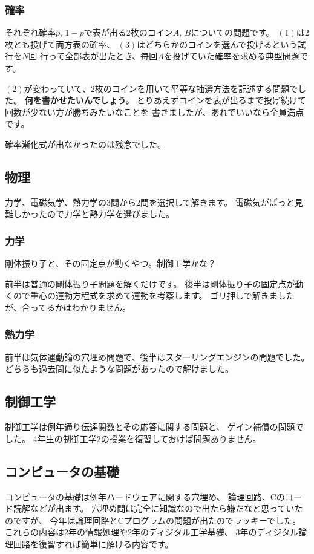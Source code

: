 \documentclass[]{jsarticle}
\begin{document}
        \subsubsection*{確率}
            それぞれ確率$p$, $1-p$で表が出る2枚のコイン$A$, $B$についての問題です。
            $(1)$は2枚とも投げて両方表の確率、
            $(3)$はどちらかのコインを選んで投げるという試行を$N$回
            行って全部表が出たとき、毎回$A$を投げていた確率を求める典型問題です。

            $(2)$が変わっていて、2枚のコインを用いて平等な抽選方法を記述する問題でした。
            \textbf{何を書かせたいんでしょう。}
            とりあえずコインを表が出るまで投げ続けて回数が少ない方が勝ちみたいなことを
            書きましたが、あれでいいなら全員満点です。

            確率漸化式が出なかったのは残念でした。
    \subsection*{物理}
        力学、電磁気学、熱力学の3問から2問を選択して解きます。
        電磁気がぱっと見難しかったので力学と熱力学を選びました。
        \subsubsection*{力学}
            剛体振り子と、その固定点が動くやつ。制御工学かな？

            前半は普通の剛体振り子問題を解くだけです。
            後半は剛体振り子の固定点が動くので重心の運動方程式を求めて運動を考察します。
            ゴリ押しで解きましたが、合ってるかはわかりません。
        \subsubsection*{熱力学}
            前半は気体運動論の穴埋め問題で、後半はスターリングエンジンの問題でした。
            どちらも過去問に似たような問題があったので解けました。
    \subsection*{制御工学}
        制御工学は例年通り伝達関数とその応答に関する問題と、
        ゲイン補償の問題でした。
        4年生の制御工学2の授業を復習しておけば問題ありません。
    \subsection*{コンピュータの基礎}
        コンピュータの基礎は例年ハードウェアに関する穴埋め、
        論理回路、Cのコード読解などが出ます。
        穴埋め問は完全に知識なので出たら嫌だなと思っていたのですが、
        今年は論理回路とCプログラムの問題が出たのでラッキーでした。
        これらの内容は2年の情報処理や2年のディジタル工学基礎、
        3年のディジタル論理回路を復習すれば簡単に解ける内容です。
\end{document}
